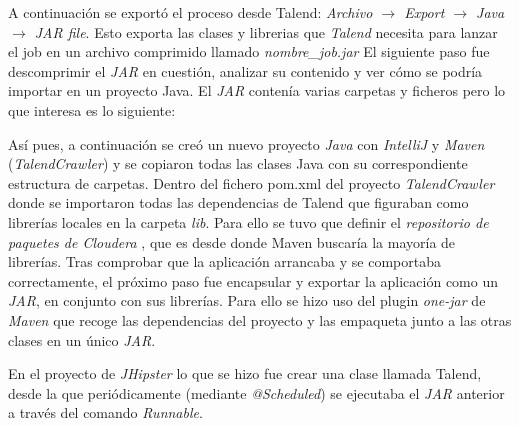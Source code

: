 A continuación se exportó el proceso desde Talend: 
\textit{Archivo $\rightarrow$ Export $\rightarrow$ Java $\rightarrow$ JAR file}. Esto exporta las clases y librerias que \textit{Talend} necesita para lanzar el job en un archivo comprimido llamado \textit{nombre\_job.jar}
El siguiente paso fue descomprimir el \textit{JAR} en cuestión, analizar su contenido y ver cómo se podría importar en un proyecto Java. El \textit{JAR} contenía varias carpetas y ficheros pero lo que interesa es lo siguiente:
\bigskip
\par 
{}
\bigskip
\par
Así pues, a continuación se creó un nuevo proyecto \textit{Java} con \textit{IntelliJ} y \textit{Maven} (\textit{TalendCrawler}) y se copiaron todas las clases Java con su correspondiente estructura de carpetas. Dentro del fichero pom.xml del proyecto \textit{TalendCrawler} donde se importaron todas las dependencias de Talend que figuraban como librerías locales en la carpeta \textit{lib}. Para ello se tuvo que definir el \textit{repositorio de paquetes de Cloudera} \cite{cloudera}, que es desde donde Maven buscaría la mayoría de librerías. Tras comprobar que la aplicación arrancaba y se comportaba correctamente, el próximo paso fue encapsular y exportar la aplicación como un \textit{JAR}, en conjunto con sus librerías. Para ello se hizo uso del plugin \textit{one-jar} de \textit{Maven} que recoge las dependencias del proyecto y las empaqueta junto a las otras clases en un único \textit{JAR}.\par 

En el proyecto de \textit{JHipster} lo que se hizo fue crear una clase llamada Talend, desde la que periódicamente (mediante \textit{@Scheduled}) se ejecutaba el \textit{JAR} anterior a través del comando \textit{Runnable}. 

